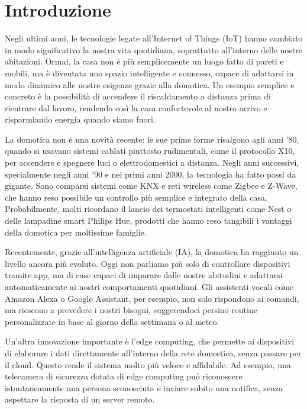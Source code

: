 
\chapter{Introduzione}
Negli ultimi anni, le tecnologie legate all'Internet of Things (IoT) hanno cambiato in modo significativo la nostra vita quotidiana, soprattutto all'interno delle nostre abitazioni. Ormai, la casa non è più semplicemente un luogo fatto di pareti e mobili, ma è diventata uno spazio intelligente e connesso, capace di adattarsi in modo dinamico alle nostre esigenze grazie alla domotica. Un esempio semplice e concreto è la possibilità di accendere il riscaldamento a distanza prima di rientrare dal lavoro, rendendo così la casa confortevole al nostro arrivo e risparmiando energia quando siamo fuori.

\vspace{0.5cm}
La domotica non è una novità recente: le sue prime forme risalgono agli anni '80, quando si usavano sistemi cablati piuttosto rudimentali, come il protocollo X10, per accendere e spegnere luci o elettrodomestici a distanza. Negli anni successivi, specialmente negli anni '90 e nei primi anni 2000, la tecnologia ha fatto passi da gigante. Sono comparsi sistemi come KNX e reti wireless come Zigbee e Z-Wave, che hanno reso possibile un controllo più semplice e integrato della casa. Probabilmente, molti ricordano il lancio dei termostati intelligenti come Nest o delle lampadine smart Philips Hue, prodotti che hanno reso tangibili i vantaggi della domotica per moltissime famiglie.

\vspace{0.5cm}
Recentemente, grazie all’intelligenza artificiale (IA), la domotica ha raggiunto un livello ancora più evoluto. Oggi non parliamo più solo di controllare dispositivi tramite app, ma di case capaci di imparare dalle nostre abitudini e adattarsi automaticamente ai nostri comportamenti quotidiani. Gli assistenti vocali come Amazon Alexa o Google Assistant, per esempio, non solo rispondono ai comandi, ma riescono a prevedere i nostri bisogni, suggerendoci persino routine personalizzate in base al giorno della settimana o al meteo.

\vspace{0.5cm}
Un'altra innovazione importante è l’edge computing, che permette ai dispositivi di elaborare i dati direttamente all’interno della rete domestica, senza passare per il cloud. Questo rende il sistema molto più veloce e affidabile. Ad esempio, una telecamera di sicurezza dotata di edge computing può riconoscere istantaneamente una persona sconosciuta e inviare subito una notifica, senza aspettare la risposta di un server remoto.


